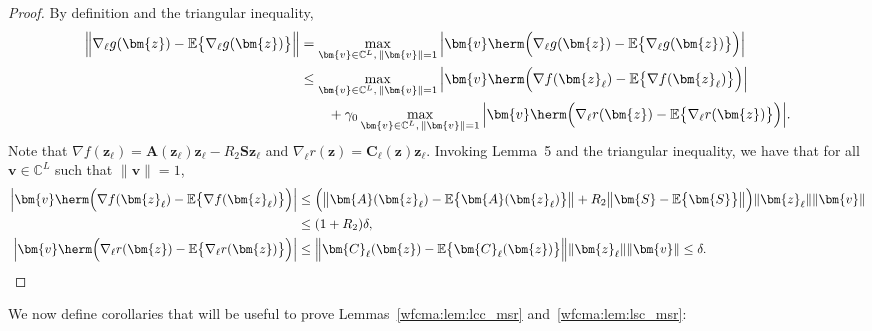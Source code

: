 \begin{proof}
By definition and the triangular inequality,
\begin{align}
	\Big\|\nabla_{\ell} g(\bm{z})-\mathbb{E}\big\{\nabla_{\ell} g(\bm{z})\big\}\Big\|
	&=\max_{\bm{v}\in\mathbb{C}^L,\,\|\bm{v}\|=1}\Big|\bm{v}\herm\Big(\nabla_{\ell} g(\bm{z})-\mathbb{E}\big\{\nabla_{\ell} g(\bm{z})\big\}\Big)\Big|\nonumber\\
	&\leq\max_{\bm{v}\in\mathbb{C}^L,\,\|\bm{v}\|=1}\Big|\bm{v}\herm\Big(\nabla f(\bm{z}_{\ell})-\mathbb{E}\big\{\nabla f(\bm{z}_{\ell})\big\}\Big)\Big|\nonumber\\
	&\qquad+\gamma_0\max_{\bm{v}\in\mathbb{C}^L,\,\|\bm{v}\|=1}\Big|\bm{v}\herm\Big(\nabla_{\ell} r(\bm{z})-\mathbb{E}\big\{\nabla_{\ell} r(\bm{z})\big\}\Big)\Big|.\nonumber
\end{align}
Note that $\nabla f(\bm{z}_{\ell})= \bm{A}(\bm{z}_{\ell})\bm{z}_{\ell}-R_2\bm{S}\bm{z}_{\ell}$ and $\nabla_{\ell} r(\bm{z})= \bm{C}_{\ell}(\bm{z})\bm{z}_{\ell}$. Invoking Lemma~5 and the triangular inequality, we have that for all $\bm{v}\in\mathbb{C}^L$ such that $\|\bm{v}\|=1$, 
\begin{align}
	\Big|\bm{v}\herm\Big(\nabla f(\bm{z}_{\ell})-\mathbb{E}\big\{\nabla f(\bm{z}_{\ell})\big\}\Big)\Big|&\leq \Big(\big\|\bm{A}(\bm{z}_{\ell})-\mathbb{E}\big\{\bm{A}(\bm{z}_{\ell})\big\}\big\|+R_2\big\|\bm{S}-\mathbb{E}\big\{\bm{S}\big\}\big\|\Big)\|\bm{z}_{\ell}\|\|\bm{v}\|\nonumber\\
	&\leq(1+R_2)\delta,\nonumber\\
	\Big|\bm{v}\herm\Big(\nabla_{\ell} r(\bm{z})-\mathbb{E}\big\{\nabla_{\ell} r(\bm{z})\big\}\Big)\Big|&\leq \Big\|\bm{C}_{\ell}(\bm{z})-\mathbb{E}\big\{\bm{C}_{\ell}(\bm{z})\big\}\Big\|\|\bm{z}_{\ell}\|\|\bm{v}\|\leq\delta.\nonumber\qedhere 
\end{align}
\end{proof}


We now define corollaries that will be useful to prove Lemmas~\ref{wfcma:lem:lcc_msr} and~\ref{wfcma:lem:lsc_msr}:

